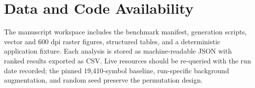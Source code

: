 \documentclass{ieeeaccess}
\begin{document}
\section*{Data and Code Availability}
The manuscript workspace includes the benchmark manifest, generation scripts, vector and 600 dpi raster figures, structured tables, and a deterministic application fixture. Each analysis is stored as machine-readable JSON with ranked results exported as CSV. Live resources should be re-queried with the run date recorded; the pinned 19,410-symbol baseline, run-specific background augmentation, and random seed preserve the permutation design.



\EOD
\end{document}
